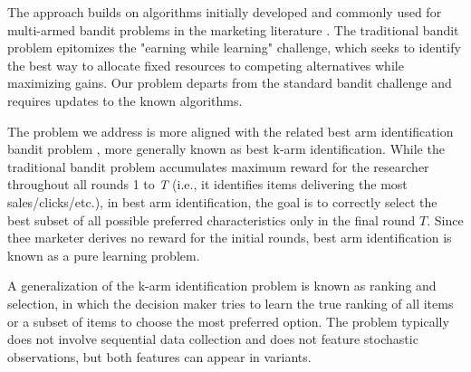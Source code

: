 \documentclass[a4paper,11pt]{article}
\newcommand{\mismin}{\textbf{max-misclass}}
\newcommand{\ts}{\textbf{TS} }
\newcommand{\edts}{$\epsilon$-$\delta$-\textbf{diffuse TS} }
\newcommand{\edtsthres}{$\epsilon$-$\delta$-\textbf{TS-thres} }
\newcommand{\uncert}{\textbf{max-uncert} }
\begin{document}


The approach builds on algorithms initially developed and commonly used for multi-armed bandit problems in the marketing literature \citep{HauserEtAl2009,schwartzetal2017,Scott2010,urban2013morphing}. The traditional bandit problem epitomizes the "earning while learning" challenge, which seeks to identify the best way to allocate fixed resources to competing alternatives while maximizing gains. Our problem departs from the standard bandit challenge and requires updates to the known algorithms.

The problem we address is more aligned with the related best arm identification bandit problem \citep{russo2016simple}, more generally known as best k-arm identification. While the traditional bandit problem accumulates maximum reward for the researcher throughout all rounds 1 to \emph{T} (i.e., it identifies items delivering the most sales/clicks/etc.), in best arm identification, the goal is to correctly select the best subset of all possible preferred characteristics only in the final round $T$. Since thee marketer derives no reward for the initial rounds, best arm identification is known as a pure learning problem.

A generalization of the k-arm identification problem is known as ranking and selection, in which the decision maker tries to learn the true ranking of all items or a subset of items to choose the most preferred option. The problem typically does not involve sequential data collection and does not feature stochastic observations, but both features can appear in variants.
\end{document}
